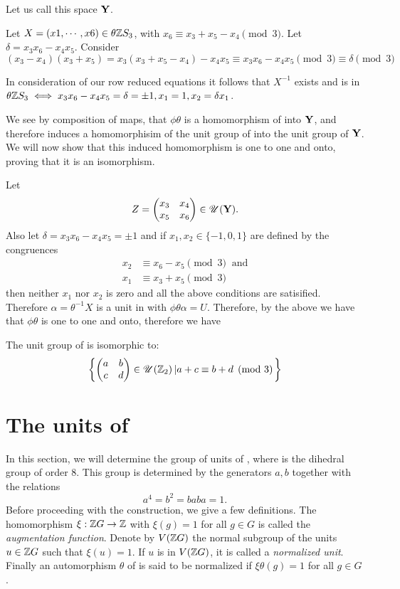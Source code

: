 \documentclass[11pt]{report}
\begin{document}
Let us call this space $\mathbf{Y}$.

                Let $X=(x1,\cdots,x6)\in\theta \mathbb{Z}S_3$, with
$ x_6\equiv x_3+x_5-x_4\pmod{3}$. Let $\delta=x_3x_6-x_4x_5$.
Consider
\[(x_3-x_4)(x_3+x_5) = x_3(x_3+x_5-x_4)-x_4x_5 \equiv
 x_3x_6-x_4x_5\pmod{3} \equiv\delta\pmod{3} \]


In consideration of our row reduced equations it follows that 
$X^{-1}$ exists and is in $\theta \mathbb{Z}S_3{} \iff
x_3x_6-x_4x_5=\delta=\pm 1, x_1 = 1, x_2 = \delta x_1$.

We see by composition of maps, that $\phi\theta$ is a homomorphism of
\intsth{}
into $\mathbf{Y}$, and
therefore induces a homomorphisim of the unit group of \intsth{} into 
the unit group of $\mathbf{Y}$. We
will now show that this induced homomorphism is one to one and 
onto, proving that it is an
isomorphism.

        Let
\[Z=
\begin{pmatrix}
x_3&x_4 \\
x_5&x_6
\end{pmatrix} \in \mathscr{U}(\mathbf{Y}).
\]
Also let $\delta=x_3x_6-x_4x_5= \pm 1$ and if $x_1,x_2 \in \{-1,0,1\}$
 are defined by the congruences
\begin{align*}
x_2 &\equiv x_6-x_5 \pmod{3}\ \textrm{ and}\\
x_1 &\equiv x_3+x_5 \pmod{3}
\end{align*}
then neither $x_1$ nor $x_2$ is zero and all the above conditions are 
satisified. Therefore $\alpha=\theta^{-1}X$ is a
unit in \intsth{} with $\phi\theta\alpha=U$. Therefore, by the 
above we have that $\phi\theta$
is one to one and onto,
therefore we have

\begin{theorem}
The unit group of \intsth{} is isomorphic to:
\[\left\{
\begin{pmatrix}
a&b\\
c&d
\end{pmatrix} \in \mathscr{U}( \mathbb{Z}_2) \left| a+c \equiv b+d \pmod{3} \right. \right\}
\]
\end{theorem}


\section{The units of \intdfr}

In this section, we will determine the group of units of \intdfr,
where \dfr{} is the dihedral
group of order 8. This group is determined by the generators $a,b$ 
together with the relations
\[a^4=b^2=baba= 1.\]
Before proceeding with the construction, we give a few 
definitions. The homomorphism
$\xi: \mathbb{Z}G\to \mathbb{Z}$ with $\xi(g) = 1$ for all $g\in G$
 is called the \emph{augmentation function}. 
Denote by $V( \mathbb{Z}G)$ the
normal subgroup of the units $u \in  \mathbb{Z}G$  such that $\xi(u) = 1$.
 If $u$ is 
in $V( \mathbb{Z}G)$, it is called a
\emph{normalized unit}. Finally an automorphism $\theta$ of \intG{}
 is said to be 
normalized if $\xi\theta(g) = 1$ for all $g \in G$.
\end{document}
